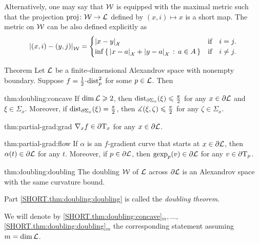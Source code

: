 Alternatively, one may say that $\mathcal{W}$ is equipped with the maximal metric such that the projection $\operatorname{\rm proj}\nolimits\colon\mathcal{W}\to\mathcal{L}$ defined by $(x,i)\mapsto x$ is a short map. 
The metric on $\mathcal{W}$ can be also defined explicitly as
\[\dist{(x,i)}{(y,j)}{\spc{W}}=
\begin{cases}
\dist{x}{y}{\spc{X}}&\text{if}\quad i= j.
\\
\inf\set{\dist{x}{a}{\spc{X}}+\dist{y}{a}{\spc{X}}}{a\in A}&\text{if}\quad i\ne j.
\end{cases}
\]

\begin{thm}{Theorem}\label{thm:doubling}
Let $\mathcal{L}$ be a finite-dimensional Alexandrov space with nonempty boundary.
Suppose $f\z=\tfrac12\cdot\distfun_p^2$ for some $p\in \mathcal{L}$.
Then

\begin{subthm}{thm:doubling:concave}
If $\operatorname{\rm dim}\nolimits \mathcal{L}\geqslant 2$, then
$\mathrm{dist}_{\partial \Sigma_x}(\xi)\leqslant \tfrac\pi2$ for any $x\in\partial \mathcal{L}$ and $\xi\in \Sigma_x$.
Moreover, if $\mathrm{dist}_{\partial \Sigma_x}(\xi)= \tfrac\pi2$, then $\measuredangle(\xi,\zeta)\leqslant\tfrac\pi2$ for any $\zeta\in \Sigma_x$. 
\end{subthm}

\begin{subthm}{thm:partial-grad:grad}
$\nabla_xf\in \partial\mathrm{T}_x$ for any $x\in\partial \mathcal{L}$.
\end{subthm}

\begin{subthm}{thm:partial-grad:flow}
If $\alpha$ is an $f$-gradient curve that starts at $x\in \partial \mathcal{L}$, then $\alpha(t)\in \partial \mathcal{L}$ for any $t$.
Moreover, if $p\in \partial \mathcal{L}$, then $\operatorname{\rm gexp}\nolimits_p(v)\in \partial \mathcal{L}$ for any $v\in\partial\mathrm{T}_p$.
\end{subthm}

\begin{subthm}{thm:doubling:doubling}
The doubling $\mathcal{W}$ of $\mathcal{L}$ across $\partial \mathcal{L}$ is an Alexandrov space with the same curvature bound.
\end{subthm}

\end{thm}

Part \ref{SHORT.thm:doubling:doubling} is called the \emph{doubling theorem}.

We will denote by 
\ref{SHORT.thm:doubling:concave}$_m,\dots,$\ref{SHORT.thm:doubling:doubling}$_m$ the corresponding statement assuming $m=\operatorname{\rm dim}\nolimits\mathcal{L}$.

